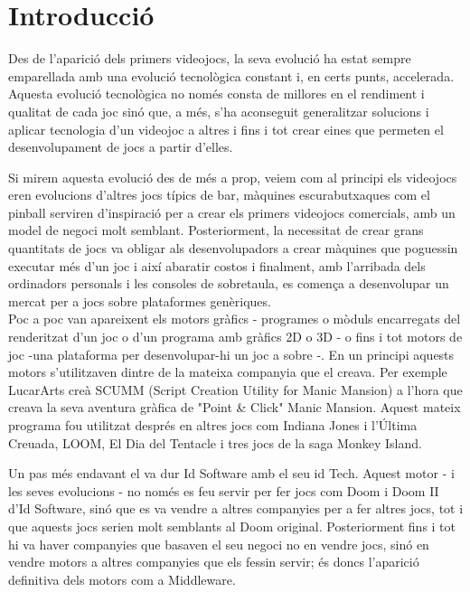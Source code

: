 \chapter{Introducció}

Des de l'aparició dels primers videojocs, la seva evolució ha estat sempre emparellada amb una evolució tecnològica constant i, en certs punts, accelerada. Aquesta evolució tecnològica no només consta de millores en el rendiment i qualitat de cada joc sinó que, a més, s'ha aconseguit generalitzar solucions i aplicar tecnologia d'un videojoc a altres i fins i tot crear eines que permeten el desenvolupament de jocs a partir d'elles.

Si mirem aquesta evolució des de més a prop, veiem com al principi els videojocs eren evolucions d'altres jocs típics de bar, màquines escurabutxaques com el pinball serviren d'inspiració per a crear els primers videojocs comercials, amb un model de negoci molt semblant. Posteriorment, la necessitat de crear grans quantitats de jocs va obligar als desenvolupadors a crear màquines que poguessin executar més d'un joc i així abaratir costos i finalment, amb l'arribada dels ordinadors personals i les consoles de sobretaula, es comença a desenvolupar un mercat per a jocs sobre plataformes genèriques.
\\

Poc a poc van apareixent els motors gràfics - programes o mòduls encarregats del renderitzat d'un joc o d'un programa amb gràfics 2D o 3D - o fins i tot motors de joc -una plataforma per desenvolupar-hi un joc a sobre -. En un principi aquests motors s'utilitzaven dintre de la mateixa companyia que el creava. Per exemple LucarArts creà {SCUMM} ({Script Creation Utility for Manic Mansion}) a l'hora que creava la seva aventura gràfica de "Point \& Click" Manic Mansion. Aquest mateix programa fou utilitzat després en altres jocs com Indiana Jones i l'Última Creuada, LOOM, El Dia del Tentacle i tres jocs de la saga Monkey Island.

Un pas més endavant el va dur Id Software amb el seu id Tech. Aquest motor - i les seves evolucions - no només es feu servir per fer jocs com Doom i Doom II d'Id Software, sinó que es va vendre a altres companyies per a fer altres jocs, tot i que aquests jocs serien molt semblants al Doom original. Posteriorment fins i tot hi va haver companyies que basaven el seu negoci no en vendre jocs, sinó en vendre motors a altres companyies que els fessin servir; és doncs l'aparició definitiva dels motors com a Middleware.
\\

